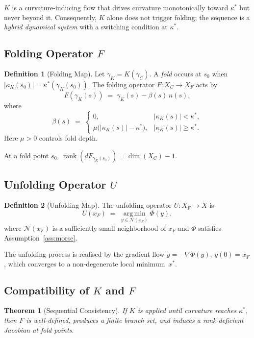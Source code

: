 \documentclass[12pt, oneside]{book}
\theoremstyle{plain}
\newtheorem{theorem}{Theorem}[section]
\theoremstyle{definition}
\newtheorem{definition}{Definition}[section]
\theoremstyle{remark}
\begin{document}
$K$ is a curvature-inducing flow that drives curvature monotonically
toward $\kappa^*$ but never beyond it. Consequently, $K$ alone does
not trigger folding; the sequence is a \emph{hybrid dynamical system}
with a switching condition at $\kappa^*$.

\subsection{Folding Operator \texorpdfstring{$F$}{F}}

\begin{definition}[Folding Map]
Let $\gamma_K = K(\gamma_C)$. A \emph{fold} occurs at $s_0$ when
$|\kappa_K(s_0)| = \kappa^*(\gamma_K(s_0))$. The folding operator
$F : X_C \to X_F$ acts by
\[
F(\gamma_K(s)) \;=\; \gamma_K(s) - \beta(s)\,n(s),
\]
where
\[
\beta(s) \;=\;
\begin{cases}
0, & |\kappa_K(s)| < \kappa^*, \\
\mu\bigl(|\kappa_K(s)| - \kappa^*\bigr), & |\kappa_K(s)| \ge \kappa^*.
\end{cases}
\]
Here $\mu > 0$ controls fold depth.
\end{definition}

At a fold point $s_0$,
$\operatorname{rank}(dF_{\gamma_K(s_0)}) = \dim(X_C) - 1$.

\subsection{Unfolding Operator \texorpdfstring{$U$}{U}}

\begin{definition}[Unfolding Map]
The unfolding operator $U : X_F \to X$ is
\[
U(x_F) \;=\; \operatorname*{arg\,min}_{y \in \mathcal{N}(x_F)}
  \Phi(y),
\]
where $\mathcal{N}(x_F)$ is a sufficiently small neighborhood of
$x_F$ and $\Phi$ satisfies Assumption~\ref{ass:morse}.
\end{definition}

The unfolding process is realised by the gradient flow
$\dot y = -\nabla\Phi(y)$, $y(0) = x_F$, which converges to a
non-degenerate local minimum~$x^*$.

\subsection{Compatibility of \texorpdfstring{$K$}{K} and
\texorpdfstring{$F$}{F}}

\begin{theorem}[Sequential Consistency]
If $K$ is applied until curvature reaches $\kappa^*$, then $F$ is
well-defined, produces a finite branch set, and induces a
rank-deficient Jacobian at fold points.
\end{theorem}
\end{document}
